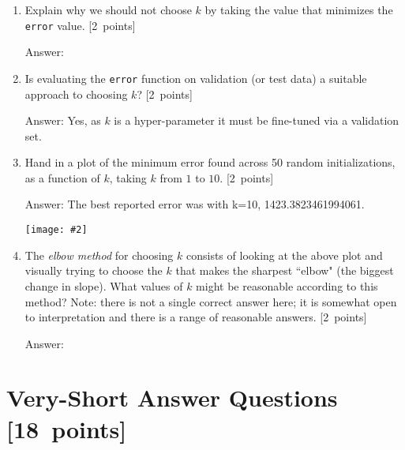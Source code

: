 \documentclass{article}
\newcommand{\blu}[1]{{\textcolor{blu}{#1}}}
\newenvironment{answer}{\par\begingroup\color{gre}Answer: }{\endgroup}
\let\ask\blu
\newcommand\pts[1]{\textcolor{pointscolour}{[#1~points]}}
\newcommand{\centerfig}[2]{\begin{center}\texttt{[image: \#2]}\end{center}}
\begin{document}
    \begin{enumerate}
        \item \ask{Explain why we should not choose $k$ by taking the value that minimizes the \texttt{error} value.} \pts{2}
        \begin{answer}

        \end{answer}
        \item \ask{Is evaluating the \texttt{error} function on validation (or test data) a suitable approach to choosing $k$?} \pts{2}
        \begin{answer}
        Yes, as $k$ is a hyper-parameter it must be fine-tuned via a validation set.
        \end{answer}
        \item \ask{Hand in a plot of the minimum error found across 50 random initializations, as a function of $k$, taking $k$ from $1$ to $10$.} \pts{2}
        \begin{answer}
        The best reported error was with k=10, 1423.3823461994061.
        \centerfig{.5}{figs/kmeans_5_2_lowest_error.png}
        \end{answer}
        \item The \emph{elbow method} for choosing $k$ consists of looking at the above plot and visually trying to choose the $k$ that makes the sharpest ``elbow" (the biggest change in slope). \ask{What values of $k$ might be reasonable according to this method?} Note: there is not a single correct answer here; it is somewhat open to interpretation and there is a range of reasonable answers. \pts{2}
        \begin{answer}

        \end{answer}
    \end{enumerate}

    \clearpage
    \section{Very-Short Answer Questions \pts{18}}
\end{document}
